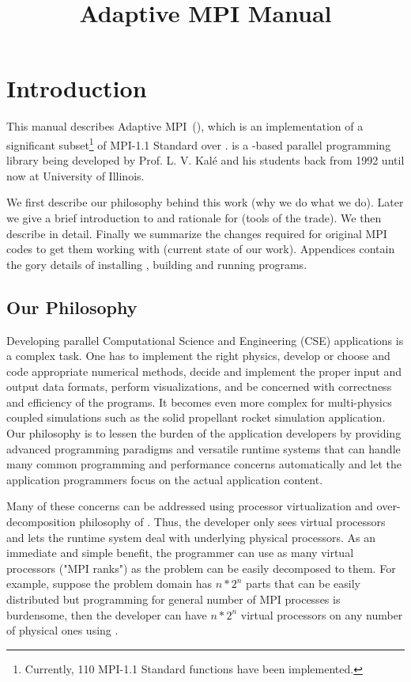 \documentclass[10pt]{article}
\title{Adaptive MPI Manual}
\begin{document}
\maketitle

\section{Introduction}

This manual describes Adaptive MPI~(\ampi{}), which is an implementation of a
significant subset\footnote{Currently, 110 MPI-1.1 Standard functions have 
been implemented.} of MPI-1.1 Standard over \charmpp{}. \charmpp{} is a
\CC{}-based parallel programming library being developed by Prof. L. V. Kal\'{e} 
and his students back from 1992 until now at University of Illinois.

We first describe our philosophy behind this work (why we do what we do).
Later we give a brief introduction to \charmpp{} and rationale for \ampi{}
(tools of the trade). We then describe \ampi{} in detail. Finally we summarize the
changes required for original MPI codes to get them working with \ampi{}
(current state of our work). Appendices contain the gory details of installing
\ampi{}, building and running \ampi{} programs.

\subsection{Our Philosophy}

Developing parallel Computational Science and Engineering (CSE) applications is
a complex task. One has to implement the right physics, develop or choose and
code appropriate numerical methods, decide and implement the proper input and
output data formats, perform visualizations, and be concerned with correctness
and efficiency of the programs. It becomes even more complex for multi-physics
coupled simulations such as the solid propellant rocket simulation application.  
Our philosophy is to lessen the burden of the application developers by
providing advanced programming paradigms and versatile runtime systems that can
handle many common programming and performance concerns automatically and let the application
programmers focus on the actual application content.

Many of these concerns can be addressed using processor virtualization and over-decomposition philosophy of \charmpp{}. Thus, the developer only sees virtual processors and lets the runtime system deal with underlying physical processors. As an immediate and simple benefit, the programmer can use as many virtual processors ("MPI ranks") as the problem can be easily decomposed to them. For example, suppose the problem domain has $n*2^n$ parts that can be easily distributed but programming for general number of MPI processes is burdensome, then the developer can have $n*2^n$ virtual processors on any number of physical ones using \ampi{}.
\end{document}
